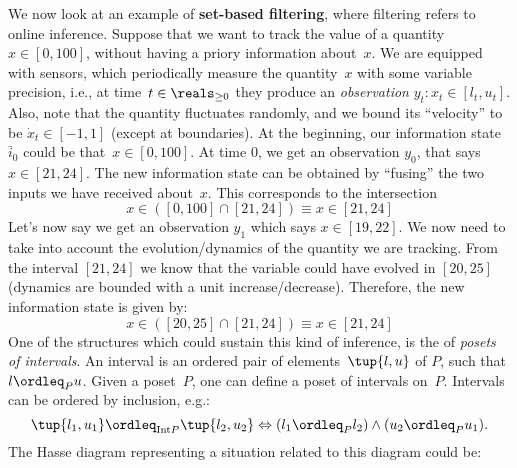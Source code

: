 \begin{example}
We now look at an example of \textbf{set-based filtering}, where filtering refers to online inference. Suppose that we want to track the value of a quantity~$x\in [0,100]$, without having a priory information about~$x$. We are equipped with sensors, which periodically measure the quantity~$x$ with some variable precision, i.e., at time~$t\in \reals_{\geq 0}$ they produce an \emph{observation} $y_t\colon x_t\in [l_t,u_t]$. Also, note that the quantity fluctuates randomly, and we bound its ``velocity'' to be $\dot{x}_t\in [-1,1]$ (except at boundaries). At the beginning, our information state $\bar{i}_0$ could be that~$x\in [0,100]$. At time 0, we get an observation $y_0$, that says $x\in [21,24]$. The new information state can be obtained by ``fusing'' the two inputs we have received about~$x$. This corresponds to the intersection
\begin{equation*}
    x\in \left( [0,100] \cap [21,24]\right)\equiv x\in [21,24]
\end{equation*}
Let's now say we get an observation $y_1$ which says $x\in [19,22]$. We now need to take into account the evolution/dynamics of the quantity we are tracking. From the interval $[21,24]$ we know that the variable could have evolved in $[20,25]$ (dynamics are bounded with a unit increase/decrease). Therefore, the new information state is given by:
\begin{equation*}
    x\in \left( [20,25] \cap [21,24]\right)\equiv x\in [21,24]
\end{equation*}
One of the structures which could sustain this kind of inference, is the of \emph{posets of intervals}.
An interval is an ordered pair of elements~$\tup{l,u}$ of $P$, such that $l\ordleq_P u$. Given a poset~$P$, one can define a poset of intervals on~$P$. Intervals can be ordered by inclusion, e.g.:
\begin{equation*}
    \tup{l_1,u_1}\ordleq_{\mathrm{Int} P}\tup{l_2,u_2} \Leftrightarrow (l_1\ordleq_P l_2)\wedge (u_2\ordleq_P u_1).
\end{equation*}
The Hasse diagram representing a situation related to this diagram could be:
\begin{center}
\end{center}
\end{example}

